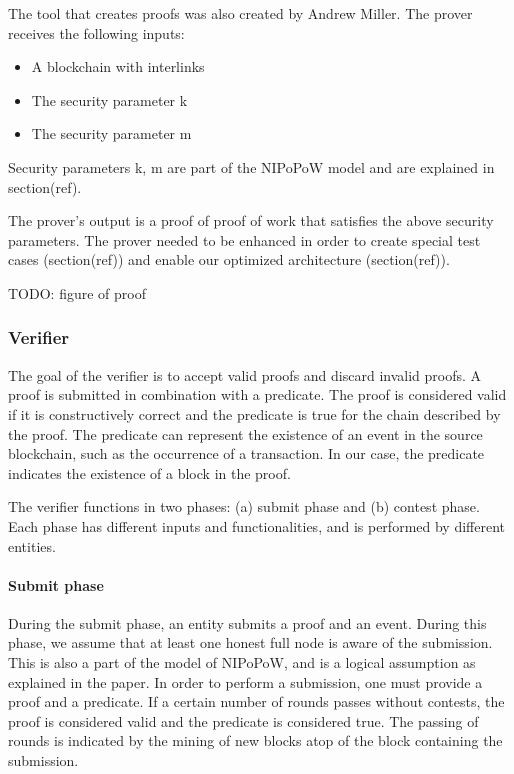 The tool that creates proofs was also created by Andrew Miller. The
prover receives the following inputs:

\begin{itemize}
    \item
        A blockchain with interlinks
    \item
        The security parameter k
    \item
        The security parameter m
\end{itemize}

Security parameters k, m are part of the NIPoPoW model and are
explained in section(ref).

The prover’s output is a proof of proof of work that satisfies the
above security parameters. The prover needed to be enhanced in order
to create special test cases (section(ref)) and enable our optimized
architecture (section(ref)).

TODO: figure of proof

\subsubsection{Verifier}

The goal of the verifier is to accept valid proofs and discard invalid
proofs. A proof is submitted in combination with a predicate. The
proof is considered valid if it is constructively correct and the
predicate is true for the chain described by the proof. The predicate
can represent the existence of an event in the source blockchain, such
as the occurrence of a transaction. In our case, the predicate
indicates the existence of a block in the proof.

The verifier functions in two phases: (a) submit phase and (b) contest
phase. Each phase has different inputs and functionalities, and is
performed by different entities.

\paragraph{Submit phase} During the submit phase, an entity submits a
proof and an event. During this phase, we assume that at least one
honest full node is aware of the submission. This is also a part of
the model of NIPoPoW, and is a logical assumption as explained in the
paper. In order to perform a submission, one must provide a proof and
a predicate. If a certain number of rounds passes without contests, the proof
is considered valid and the predicate is considered true. The passing of rounds
is indicated by the mining of new blocks atop of the block containing the
submission.

